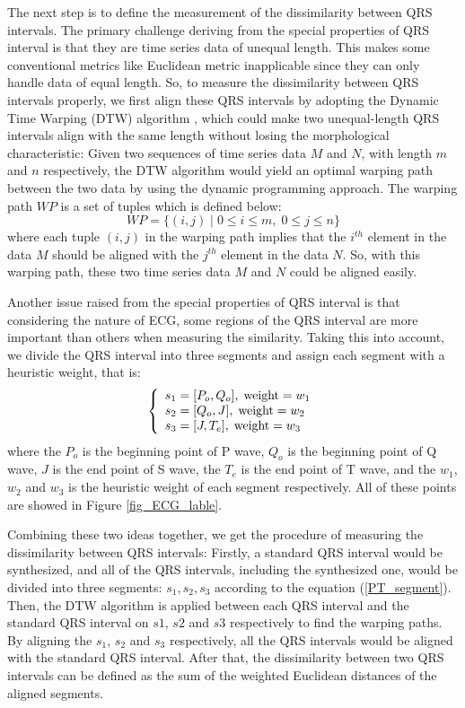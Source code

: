\documentclass[conference]{IEEEtran}
\begin{document}
The next step is to define the measurement of the dissimilarity between QRS intervals. The primary challenge deriving from the special properties of QRS interval is that they are time series data of unequal length. This makes some conventional metrics like Euclidean metric inapplicable since they can only handle data of equal length. So, to measure the dissimilarity between QRS intervals properly, we first align these QRS intervals by adopting the Dynamic Time Warping (DTW) algorithm \cite{sakoe1978dynamic}, which could make two unequal-length QRS intervals align with the same length without losing the morphological characteristic: Given two sequences of time series data $ M $ and $ N $, with length $ m $ and $ n $ respectively, the DTW algorithm would yield an optimal warping path between the two data by using the dynamic programming approach. The warping path $  WP $ is a set of tuples which is defined below:
\begin{equation}
WP = \{ (i, j) \; | \; 0 \leq i \leq m, \; 0 \leq j \leq n  \}
\end{equation}
where each tuple $ (i, j) $ in the warping path implies that the $ i^{th} $ element in the data $ M $ should be aligned with the $ j^{th} $ element in the data $ N $. So, with this warping path, these two time series data $ M $ and $ N $ could be aligned easily.


Another issue raised from the special properties of QRS interval is that considering the nature of ECG, some regions of the QRS interval are more important than others when measuring the similarity. Taking this into account, we divide the QRS interval into three segments and assign each segment with a heuristic weight, that is:
\begin{equation}\label{PT_segment}
\left\{ \begin{array}{ll}
s_1 = [P_o, Q_o], \; \textmd{weight}=w_1\\
s_2 = [Q_o, J], \;  \textmd{weight}=w_2\\
s_3 = [J, T_e], \; \textmd{weight}=w_3
\end{array} \right.
\end{equation}
where the $ P_o $ is the beginning point of P wave, $ Q_o $ is the beginning point of Q wave, $ J $ is the end point of S wave, the $ T_e $ is the end point of T wave, and the $ w_1 $, $ w_2 $ and $ w_3 $ is the heuristic weight of each segment respectively. All of these points are showed in Figure \ref{fig_ECG_lable}.


Combining these two ideas together, we get the procedure of measuring the dissimilarity between QRS intervals: Firstly, a standard QRS interval would be synthesized, and all of the QRS intervals, including the synthesized one, would be divided into three segments: $ s_1, s_2, s_3 $ according to the equation (\ref{PT_segment}). Then, the DTW algorithm is applied between each QRS interval and the standard QRS interval on $ s1 $, $ s2 $ and $ s3 $ respectively to find the warping paths. By aligning the $ s_1 $, $ s_2 $ and $ s_3 $ respectively, all the QRS intervals would be aligned with the standard QRS interval. After that, the dissimilarity between two QRS intervals can be defined as the sum of the weighted Euclidean distances of the aligned segments. 
\end{document}
